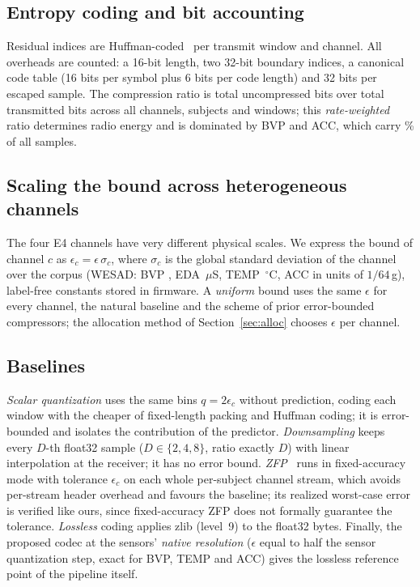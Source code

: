 \documentclass[journal]{IEEEtran}
\begin{document}
\subsection{Entropy coding and bit accounting}
Residual indices are Huffman-coded~\cite{huffman1952} per transmit window and channel. All overheads are counted: a 16-bit length, two 32-bit boundary indices, a canonical code table (16 bits per symbol plus 6 bits per code length) and 32 bits per escaped sample. The compression ratio is total uncompressed bits over total transmitted bits across all channels, subjects and windows; this \emph{rate-weighted} ratio determines radio energy and is dominated by BVP and ACC, which carry \pctSamplesBVPACC\% of all samples.

\subsection{Scaling the bound across heterogeneous channels}
\label{sec:scale}
The four E4 channels have very different physical scales. We express the bound of channel $c$ as $\epsilon_c=\epsilon\,\sigma_c$, where $\sigma_c$ is the global standard deviation of the channel over the corpus (WESAD: BVP \sigmaBVP, EDA \sigmaEDA\,$\mu$S, TEMP \sigmaTEMP\,$^\circ$C, ACC \sigmaACC{} in units of $1/64$\,g), label-free constants stored in firmware. A \emph{uniform} bound uses the same $\epsilon$ for every channel, the natural baseline and the scheme of prior error-bounded compressors; the allocation method of Section~\ref{sec:alloc} chooses $\epsilon$ per channel.

\subsection{Baselines}
\emph{Scalar quantization} uses the same bins $q=2\epsilon_c$ without prediction, coding each window with the cheaper of fixed-length packing and Huffman coding; it is error-bounded and isolates the contribution of the predictor. \emph{Downsampling} keeps every $D$-th float32 sample ($D\in\{2,4,8\}$, ratio exactly $D$) with linear interpolation at the receiver; it has no error bound. \emph{ZFP}~\cite{lindstrom2014} runs in fixed-accuracy mode with tolerance $\epsilon_c$ on each whole per-subject channel stream, which avoids per-stream header overhead and favours the baseline; its realized worst-case error is verified like ours, since fixed-accuracy ZFP does not formally guarantee the tolerance. \emph{Lossless} coding applies zlib (level~9) to the float32 bytes. Finally, the proposed codec at the sensors' \emph{native resolution} ($\epsilon$ equal to half the sensor quantization step, exact for BVP, TEMP and ACC) gives the lossless reference point of the pipeline itself.
\end{document}
